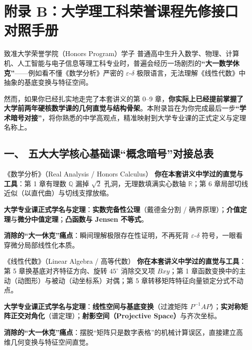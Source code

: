 
\section{附录 B：大学理工科荣誉课程先修接口对照手册}\label{app:honors}

\begin{corebox}{致准大学荣誉学院（Honors Program）学子}
普通高中生升入数学、物理、计算机、人工智能与电子信息等理工科专业时，普遍会经历一场剧烈的\textbf{“大一数学休克”}——例如看不懂《数学分析》严密的 $\varepsilon$-$\delta$ 极限语言，无法理解《线性代数》中抽象的基底变换与特征空间。

然而，如果你已经扎实地走完了本套讲义的第 0–9 章，\textbf{你实际上已经提前掌握了大学前两年硬核数学课的几何直觉与结构骨架}。本附录旨在为你完成最后一步\textbf{“学术暗号对接”}，将你熟悉的中学高观点，精准映射到大学专业课的正式定义与定理名称上。
\end{corebox}

\subsection*{一、 五大大学核心基础课“概念暗号”对接总表}

\begin{fastcard}{《数学分析》（Real Analysis / Honors Calculus）}
\textbf{你在本套讲义中学过的直觉与工具}：第 1 章有理数 $\mathbb{Q}$ 漏掉 $\sqrt{2}$ 孔洞，无理数填满实心数轴 $\mathbb{R}$；第 6 章局部切线近似（以直代曲）与切线支撑放缩。
\par\textbf{大学专业课正式学名与定理}：\textbf{实数完备性公理}（戴德金分割 / 确界原理）；\textbf{介值定理}与\textbf{微分中值定理}；\textbf{凸函数与 Jensen 不等式}。
\par\textbf{消除的“大一休克”痛点}：瞬间理解极限存在性证明，不再死背 $\varepsilon$-$\delta$ 符号，一眼看穿微分局部线性化本质。
\end{fastcard}

\begin{fastcard}{《线性代数》（Linear Algebra / 高等代数）}
\textbf{你在本套讲义中学过的直觉与工具}：第 5 章换基底对齐特征方向、旋转 $45^\circ$ 消除交叉项 $Bxy$；第 1 章函数变换中的主动（动图形）与被动（动坐标系）对偶；第 5 章转移矩阵特征向量锁定分式不动点。
\par\textbf{大学专业课正式学名与定理}：\textbf{线性空间与基底变换}（过渡矩阵 $P^{-1}AP$）；\textbf{实对称矩阵正交对角化}（谱定理）；\textbf{射影空间（Projective Space）}与齐次坐标。
\par\textbf{消除的“大一休克”痛点}：摆脱“矩阵只是数字表格”的机械计算误区，直接建立高维几何变换与特征空间直觉。
\end{fastcard}

